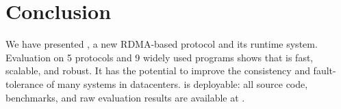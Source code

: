 \section{Conclusion}\label{sec:conclusion}

We have presented \xxx, a new RDMA-based \paxos protocol and its runtime 
system. Evaluation on 5 \paxos protocols and 9 widely used programs 
shows that \xxx is fast, scalable, and robust. It has the potential to improve 
the consistency and fault-tolerance of many systems in datacenters. \xxx is 
deployable: all source code, benchmarks, and raw evaluation results are 
available at \github.
